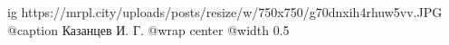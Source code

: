  
 
 
 
 

\ifcmt
  ig https://mrpl.city/uploads/posts/resize/w/750x750/g70dnxih4rhuw5vv.JPG
	@caption Казанцев И. Г.
  @wrap center
  @width 0.5
\fi
